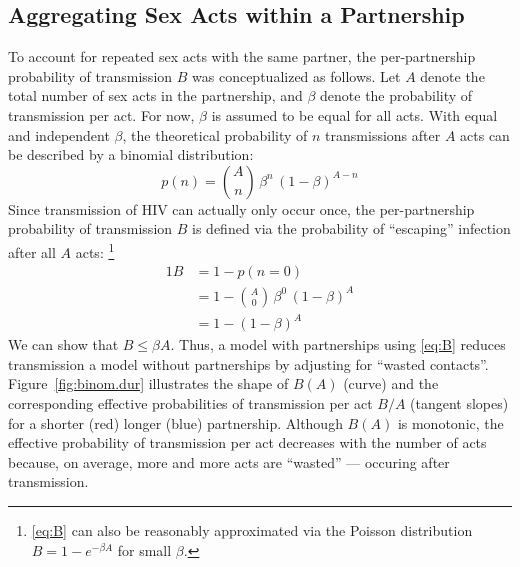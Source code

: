 \subsection{Aggregating Sex Acts within a Partnership}\label{foi.prior.bhom}
To account for repeated sex acts with the same partner,
the per-partnership probability of transmission $B$ was conceptualized as follows. %
Let $A$ denote the total number of sex acts in the partnership,
and $\beta$ denote the probability of transmission per act.
For now, $\beta$ is assumed to be equal for all acts.
With equal and independent $\beta$,
the theoretical probability of $n$ transmissions after $A$ acts
can be described by a binomial distribution:
\begin{equation}\label{eq:B.n}
  p(n) = {A \choose n}\,\beta^n\,{(1 - \beta)}^{A-n}
\end{equation}
Since transmission of HIV can actually only occur once,
the per-partnership probability of transmission $B$ is defined via
the probability of ``escaping'' infection after all $A$ acts:%
\footnote{\eqref{eq:B} can also be reasonably approximated
  via the Poisson distribution $B = 1 - e^{-\beta A}$ for small $\beta$.}
\begin{alignat}{1}\label{eq:B}
  B &= 1 - p(n = 0) \nonumber\\
  &= 1 - {A \choose 0}\,\beta^0\,{(1 - \beta)}^{A} \nonumber\\
  &= 1 - {(1 - \beta)}^A
\end{alignat}
We can show that $B \le \beta A$.
Thus, a model with partnerships using \eqref{eq:B}
reduces transmission \vs a model without partnerships
by adjusting for ``wasted contacts''.
Figure~\ref{fig:binom.dur} illustrates the shape of $B(A)$ (curve)
and the corresponding effective probabilities of transmission per act $B/A$ (tangent slopes)
for a shorter (red) \vs longer (blue) partnership.
Although $B(A)$ is monotonic, the effective probability of transmission per act
decreases with the number of acts because, on average,
more and more acts are ``wasted'' --- occuring after transmission.
